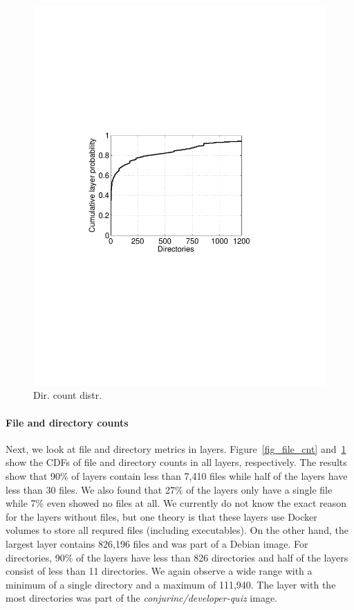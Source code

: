 \begin{figure}
\begin{minipage}{0.23\textwidth}
		\includegraphics[width=1\textwidth]{graphs/dir_cnt.pdf}
		\caption{Dir. count distr.
		}
		\label{fig_dir_cnt}
	\end{minipage}%
\end{figure}
%

\paragraph{File and directory counts}

Next, we look at file and directory metrics in layers.
Figure~\ref{fig_file_cnt} and~\ref{fig_dir_cnt} show the CDFs of file
and directory counts in all layers, respectively.
%
The results show that 90\% of layers contain less than 7,410 files while half
of the layers have less than 30 files.
%
We also found that 27\% of the layers only have a single file while 7\% even showed
no files at all. We currently do not know the exact reason for the layers without files,
but one theory is that these layers use Docker volumes to store
all requred files (including executables).
On the other hand,
the largest layer contains 826,196 files and was part of a Debian image.
%
%
For directories, 90\% of the layers have less than 826 directories and half of the layers consist
of less than 11 directories. We again observe a wide range with a minimum of a single directory
and a maximum of 111,940. The layer with the most directories was part of
the \textit{conjurinc/developer-quiz} image.

